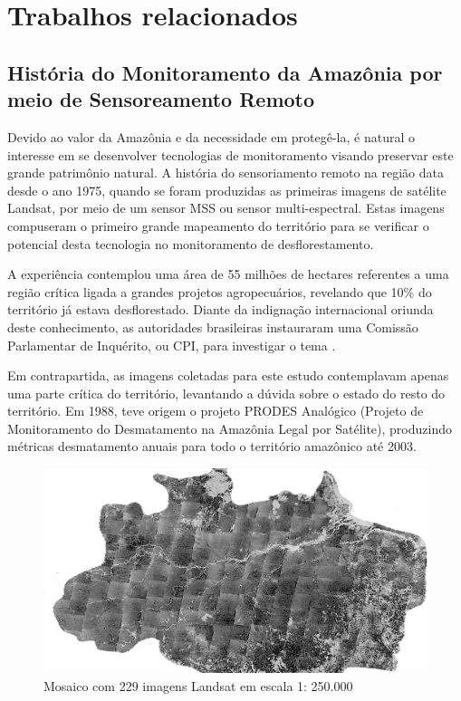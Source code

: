 \chapter{Trabalhos relacionados}
\label{relacionados}

\section{História do Monitoramento da Amazônia por meio de Sensoreamento Remoto}

Devido ao valor da Amazônia e da necessidade em protegê-la, é natural o interesse em se desenvolver tecnologias de monitoramento visando preservar este grande patrimônio natural. A história do sensoriamento remoto na região data desde o ano 1975, quando se foram produzidas as primeiras imagens de satélite Landsat, por meio de um sensor MSS ou sensor multi-espectral.  Estas imagens compuseram o primeiro grande mapeamento do território para se verificar o potencial desta tecnologia no monitoramento de desflorestamento.

A experiência contemplou uma área de 55 milhões de hectares referentes a uma região crítica ligada a grandes projetos agropecuários, revelando que 10\% do território já estava desflorestado. Diante da indignação internacional oriunda deste conhecimento, as autoridades brasileiras instauraram uma Comissão Parlamentar de Inquérito, ou CPI, para investigar o tema \cite{hist_amz}. 

Em contrapartida, as imagens coletadas para este estudo contemplavam apenas uma parte crítica do território, levantando a dúvida sobre o estado do resto do território. Em 1988, teve origem o projeto PRODES Analógico (Projeto de Monitoramento do Desmatamento na Amazônia Legal por Satélite), produzindo métricas desmatamento anuais para todo o território amazônico até 2003.

\begin{figure}[htb]
	\centering
	\begin{minipage}{0.9\linewidth}
		\centering
		\includegraphics[width=\linewidth]{tg1/figuras/amazon.png}
		\caption{Mosaico com 229 imagens Landsat em escala 1: 250.000 \cite{hist_amz}} \label{fig:amz1988}
	\end{minipage}
\end{figure}


